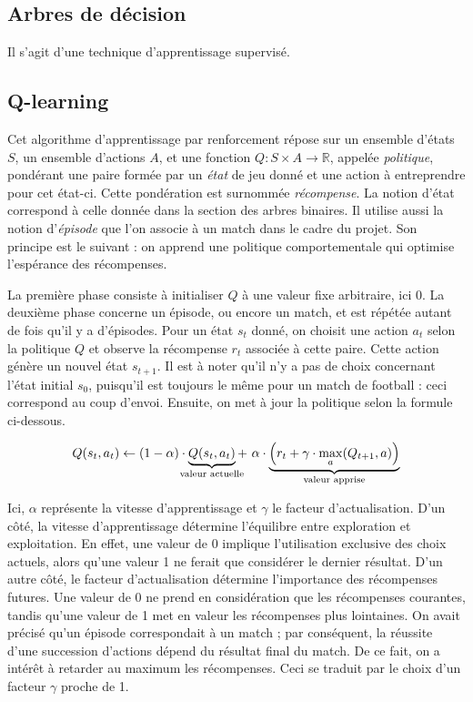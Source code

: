 \documentclass[12pt,a4paper]{article}
\begin{document}
\subsection*{Arbres de d\'ecision}
Il s'agit d'une technique d'apprentissage supervis\'e. 

\subsection*{Q-learning}
Cet algorithme d'apprentissage par renforcement r\'epose sur un ensemble 
d'\'etats $S$, un ensemble d'actions $A$, et une fonction $Q: S \times A \to 
\mathbb{R}$, appel\'ee {\itshape politique}, pond\'erant une paire form\'ee 
par un {\itshape \'etat} de jeu donn\'e et une action \`a entreprendre pour cet 
\'etat-ci. Cette pond\'eration est surnomm\'ee {\itshape r\'ecompense}. La 
notion d'\'etat correspond \`a celle donn\'ee dans la section des arbres 
binaires. Il utilise aussi la notion d'{\itshape \'episode} que l'on associe 
\`a un match dans le cadre du projet. Son principe est le suivant : on apprend 
une politique comportementale qui optimise l'esp\'erance des r\'ecompenses.

La premi\`ere phase consiste \`a initialiser $Q$ \`a une valeur fixe 
arbitraire, ici 0. La deuxi\`eme phase concerne un \'episode, ou encore un 
match, et est r\'ep\'et\'ee autant de fois qu'il y a d'\'episodes. Pour un 
\'etat $s_t$ donn\'e, on choisit une action $a_t$ selon la politique $Q$ et 
observe la r\'ecompense $r_t$ associ\'ee \`a cette paire. Cette action 
g\'en\`ere un nouvel \'etat $s_{t+1}$. Il est \`a noter qu'il n'y a pas de 
choix concernant l'\'etat initial $s_0$, puisqu'il est toujours le m\^eme pour 
un match de football : ceci correspond au coup d'envoi. Ensuite, on met \`a 
jour la politique selon la formule ci-dessous.

\begin{equation*}
  Q(s_t,a_t) \gets (1-\alpha) \cdot 
  \underbrace{Q(s_t,a_t)}_{\mathclap{\text{valeur actuelle}}} + \ \alpha \cdot 
\underbrace{\Big(r_t + \gamma \cdot \max_a(Q_{t+1},a) 
  \Big)}_{\mathclap{\text{valeur   apprise}}}
\end{equation*}

Ici, $\alpha$ repr\'esente la vitesse d'apprentissage et $\gamma$ le facteur 
d'actualisation. D'un c\^ot\'e, la vitesse d'apprentissage d\'etermine 
l'\'equilibre entre exploration et exploitation. En effet, une valeur de 
0 implique l'utilisation exclusive des choix actuels, alors qu'une 
valeur 1 ne ferait que consid\'erer le dernier r\'esultat.
D'un autre c\^ot\'e, le facteur d'actualisation d\'etermine l'importance des 
r\'ecompenses futures. Une valeur de 0 ne prend en consid\'eration que les 
r\'ecompenses courantes, tandis qu'une valeur de 1 met en valeur les 
r\'ecompenses plus lointaines. On avait pr\'ecis\'e qu'un \'episode 
correspondait \`a un match ; par cons\'equent, la r\'eussite d'une succession 
d'actions d\'epend du r\'esultat final du match. De ce fait, on a int\'er\^et 
\`a retarder au maximum les r\'ecompenses. Ceci se traduit par le choix d'un 
facteur $\gamma$ proche de 1.
\end{document}
